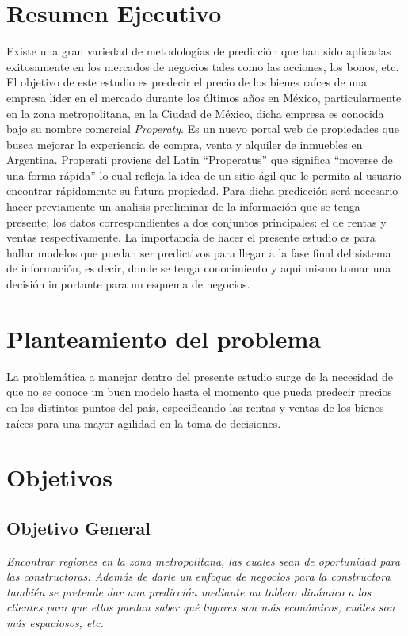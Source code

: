 \documentclass[a4paper,12pt]{article}
\begin{document}
\section{Resumen Ejecutivo}
Existe una gran variedad de metodologías de predicción que han sido aplicadas exitosamente en los mercados de negocios tales como 
las acciones, los bonos, etc. El objetivo de este estudio es predecir el precio de los bienes raíces de una empresa líder en el 
mercado durante los últimos años en México, particularmente en la zona metropolitana, en la Ciudad de México, dicha empresa es 
conocida bajo su nombre comercial \textit{Properaty}. Es un nuevo portal web de propiedades que busca mejorar la 
experiencia de compra, venta y alquiler de inmuebles en Argentina. Properati proviene del Latin ``Properatus'' que significa 
``moverse de una forma rápida'' lo cual refleja la idea de un sitio ágil que le permita al usuario encontrar rápidamente su 
futura propiedad\cite{url}. Para dicha predicción será necesario hacer previamente un analisis preeliminar de la información que 
se tenga presente; los datos correspondientes a dos conjuntos principales: el de rentas y ventas respectivamente. La importancia 
de hacer el presente estudio es para hallar modelos que puedan ser predictivos para llegar a la fase final del sistema de 
información, es decir, donde se tenga conocimiento y aqui mismo tomar una decisión importante para un esquema de negocios.
\section{Planteamiento del problema}
La problemática a manejar dentro del presente estudio surge de la necesidad de que no se conoce un buen modelo hasta el momento 
que pueda predecir precios en los distintos puntos del país, especificando las rentas y ventas de los bienes raíces para una mayor 
agilidad en la toma de decisiones.
\section{Objetivos}
\subsection{Objetivo General}
\textit{Encontrar regiones en la zona metropolitana, las cuales sean de oportunidad para las constructoras. Además de darle un 
enfoque de negocios para la constructora también se pretende dar una predicción mediante un tablero dinámico a los clientes para 
que ellos puedan saber qué lugares son más económicos, cuáles son más espaciosos, etc.}
\end{document}
